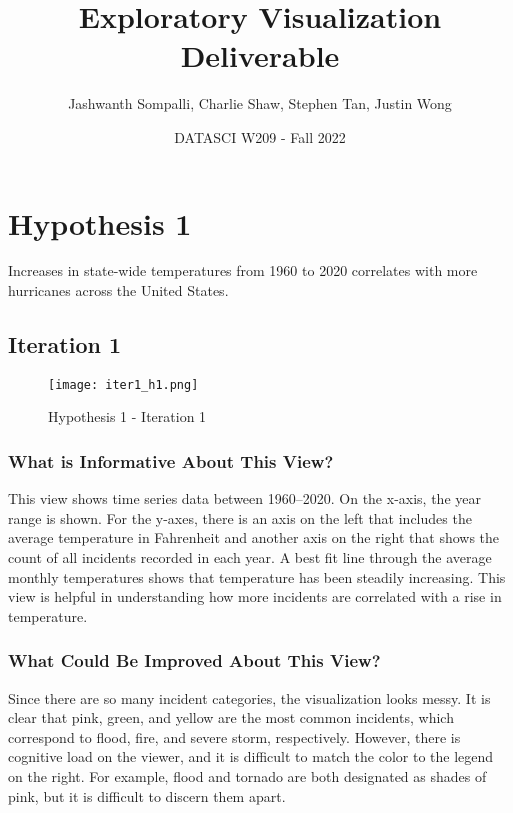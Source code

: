 \documentclass[11pt, letter]{article}
\title{Exploratory Visualization Deliverable}
\author{Jashwanth Sompalli, Charlie Shaw, Stephen Tan, Justin Wong}
\date{ \small DATASCI W209 - Fall 2022}
\begin{document}
\maketitle 

\begin{center}
 

\end{center}

\setcounter{page}{1}

\section*{Hypothesis 1}
\noindent Increases in state-wide temperatures from 1960 to 2020 correlates with more hurricanes across the United States.
\subsection*{Iteration 1}

\begin{figure}[h!]
    \centering
    \texttt{[image: iter1\_h1.png]}
    \caption{Hypothesis 1 - Iteration 1}
    \label{fig:my_label}
\end{figure}

\subsubsection*{What is Informative About This View?}
This view shows time series data between 1960–2020. On the x-axis, the year range is shown. For the y-axes, there is an axis on the left that includes the average temperature in Fahrenheit and another axis on the right that shows the count of all incidents recorded in each year. A best fit line through the average monthly temperatures shows that temperature has been steadily increasing. This view is helpful in understanding how more incidents are correlated with a rise in temperature.
\subsubsection*{What Could Be Improved About This View?}
 Since there are so many incident categories, the visualization looks messy. It is clear that pink, green, and yellow are the most common incidents, which correspond to flood, fire, and severe storm, respectively. However, there is cognitive load on the viewer, and it is difficult to match the color to the legend on the right. For example, flood and tornado are both designated as shades of pink, but it is difficult to discern them apart. 
\end{document}
